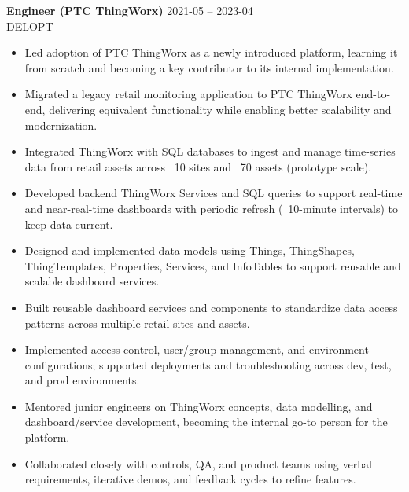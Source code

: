 \documentclass[11pt]{article}
\begin{document}
\vspace{4pt}

\textbf{ Engineer (PTC ThingWorx) } \hfill 2021-05 -- 2023-04\\
DELOPT \\

\begin{itemize}[leftmargin=*,noitemsep]
  
  \item Led adoption of PTC ThingWorx as a newly introduced platform, learning it from scratch and becoming a key contributor to its internal implementation.
  
  \item Migrated a legacy retail monitoring application to PTC ThingWorx end-to-end, delivering equivalent functionality while enabling better scalability and modernization.
  
  \item Integrated ThingWorx with SQL databases to ingest and manage time-series data from retail assets across ~10 sites and ~70 assets (prototype scale).
  
  \item Developed backend ThingWorx Services and SQL queries to support real-time and near-real-time dashboards with periodic refresh (~10-minute intervals) to keep data current.
  
  \item Designed and implemented data models using Things, ThingShapes, ThingTemplates, Properties, Services, and InfoTables to support reusable and scalable dashboard services.
  
  \item Built reusable dashboard services and components to standardize data access patterns across multiple retail sites and assets.
  
  \item Implemented access control, user/group management, and environment configurations; supported deployments and troubleshooting across dev, test, and prod environments.
  
  \item Mentored junior engineers on ThingWorx concepts, data modelling, and dashboard/service development, becoming the internal go-to person for the platform.
  
  \item Collaborated closely with controls, QA, and product teams using verbal requirements, iterative demos, and feedback cycles to refine features.
  
\end{itemize}
\end{document}

